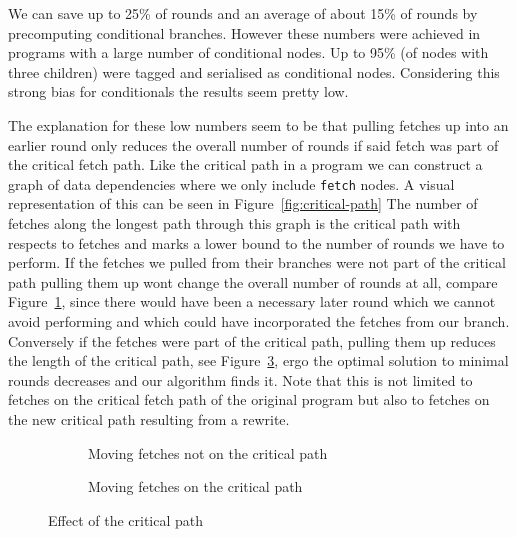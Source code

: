 We can save up to 25\% of rounds and an average of about 15\% of rounds by precomputing conditional branches.
However these numbers were achieved in programs with a large number of conditional nodes.
Up to 95\% (of nodes with three children) were tagged and serialised as conditional nodes.
Considering this strong bias for conditionals the results seem pretty low.

The explanation for these low numbers seem to be that pulling fetches up into an earlier round only reduces the overall number of rounds if said fetch was part of the critical fetch path.
Like the critical path in a program we can construct a graph of data dependencies where we only include \texttt{fetch} nodes.
A visual representation of this can be seen in Figure~\ref{fig:critical-path}
The number of fetches along the longest path through this graph is the critical path with respects to fetches and marks a lower bound to the number of rounds we have to perform.
If the fetches we pulled from their branches were not part of the critical path pulling them up wont change the overall number of rounds at all, compare Figure~\ref{fig:rewrite-not-crit-path}, since there would have been a necessary later round which we cannot avoid performing and which could have incorporated the fetches from our branch.
Conversely if the fetches were part of the critical path, pulling them up reduces the length of the critical path, see Figure~\ref{fig:rewrite-crit-path}, ergo the optimal solution to minimal rounds decreases and our algorithm finds it.
Note that this is not limited to fetches on the critical fetch path of the original program but also to fetches on the new critical path resulting from a rewrite.

\begin{figure}[h]

  \begin{subfigure}[b]{.5\textwidth}
    \caption{Moving fetches not on the critical path}
    \label{fig:rewrite-not-crit-path}
  \end{subfigure}

  \begin{subfigure}[b]{.5\textwidth}
    \caption{Moving fetches on the critical path}
    \label{fig:rewrite-crit-path}
  \end{subfigure}

  \caption{Effect of the critical path}
\end{figure}

%

